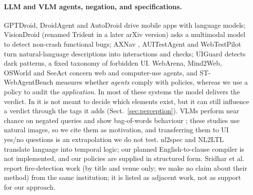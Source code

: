 \paragraph{LLM and VLM agents, negation, and specifications.}
GPTDroid, DroidAgent and AutoDroid \cite{liu2024gptdroid,yoon2024droidagent,wen2024autodroid}
drive mobile apps with language models; VisionDroid (renamed Trident in a later
arXiv version) \cite{liu2024visiondroid} asks a multimodal model to detect non-crash
functional bugs; AXNav \cite{taeb2024axnav},
AUITestAgent \cite{hu2024auitestagent} and WebTestPilot \cite{teoh2026webtestpilot}
turn natural-language descriptions into interactions and checks; UIGuard
\cite{chen2023uiguard} detects dark patterns, a fixed taxonomy of forbidden UI.
WebArena, Mind2Web, OSWorld and SeeAct
\cite{zhou2024webarena,deng2023mind2web,xie2024osworld,zheng2024seeact} concern web
and computer-use agents, and ST-WebAgentBench
\cite{levy2026stwebagentbench} measures whether \emph{agents} comply with
policies, whereas we use a policy to audit the \emph{application}. In most of
these systems the model delivers the verdict. In \sys{} it is not meant to decide
which elements exist, but it can still influence a verdict through the tags it
adds (Sect.~\ref{sec:perception}). VLMs perform near chance on negated queries
\cite{alhamoud2025negation} and show bag-of-words behaviour
\cite{yuksekgonul2023aro,ma2023crepe}; these studies use natural images, so we
cite them as motivation, and transferring them to UI yes/no questions is an
extrapolation we do not test. nl2spec and NL2LTL
\cite{cosler2023nl2spec,fuggitti2023nl2ltl} translate language into temporal
logic; our planned English-to-clause compiler is not implemented, and our policies
are supplied in structured form. Sridhar et al.\ \cite{sridhar2020firepixel,sridhar2020rule} report fire-detection
work (by title and venue only; we make no claim about their method) from the same
institution; it is listed as adjacent work, not as support for our approach.
